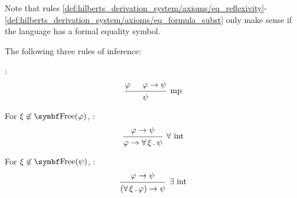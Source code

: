 \begin{definition}
\begin{RefList}
    Note that rules \eqref{def:hilberts_derivation_system/axioms/eq_reflexivity}-\eqref{def:hilberts_derivation_system/axioms/eq_formula_subst} only make sense if the language has a formal equality symbol.

     The following three rules of inference:
    \begin{DefEnum}
       :
      \begin{equation}\label{eq:def:hilberts_derivation_system/rules/modus_ponens}
        \begin{prooftree}
          \hypo{\varphi}
          \hypo{\varphi \to \psi}
          \infer2[mp]{\psi}
        \end{prooftree}
      \end{equation}

       For \( \xi \not\in \Bold{Free}(\varphi) \), :
      \begin{equation}\label{eq:def:hilberts_derivation_system/rules/forall_intro}
        \begin{prooftree}
          \hypo{\varphi \to \psi}
          \infer1[\( \forall \) \text{int}]{\varphi \to \ForAll{\xi} \psi}
        \end{prooftree}
      \end{equation}

       For \( \xi \not\in \Bold{Free}(\psi) \), :
      \begin{equation}\label{eq:def:hilberts_derivation_system/rules/exists_intro}
        \begin{prooftree}
          \hypo{\varphi \to \psi}
          \infer1[\( \exists \) \text{int}]{(\ForAll{\xi} \varphi) \to \psi}
        \end{prooftree}
      \end{equation}
    \end{DefEnum}
  \end{RefList}
\end{definition}

